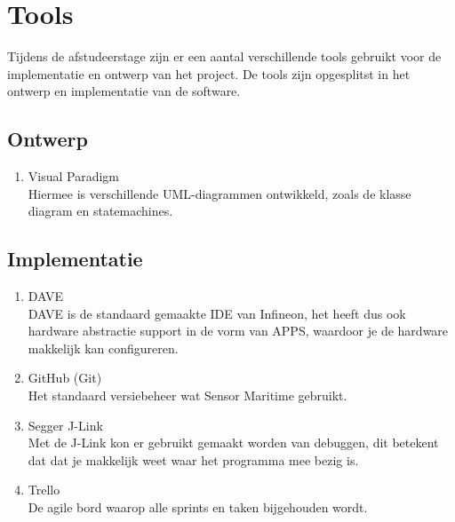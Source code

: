 \section{Tools}
Tijdens de afstudeerstage zijn er een aantal verschillende tools gebruikt voor de implementatie en ontwerp van het project. De tools zijn opgesplitst in het ontwerp en implementatie van de software.

\subsection{Ontwerp}
\begin{enumerate}
	\item Visual Paradigm \\ Hiermee is verschillende UML-diagrammen ontwikkeld, zoals de klasse diagram en statemachines.
\end{enumerate}
\subsection{Implementatie}
\begin{enumerate}
	\item DAVE \\ DAVE is de standaard gemaakte IDE van Infineon, het heeft dus ook hardware abstractie support in de vorm van APPS, waardoor je de hardware makkelijk kan configureren.
	\item GitHub (Git) \\ Het standaard versiebeheer wat Sensor Maritime gebruikt.
	\item Segger J-Link \\ Met de J-Link kon er gebruikt gemaakt worden van debuggen, dit betekent dat dat je makkelijk weet waar het programma mee bezig is.
	\item Trello \\ De agile bord waarop alle sprints en taken bijgehouden wordt.
\end{enumerate}

